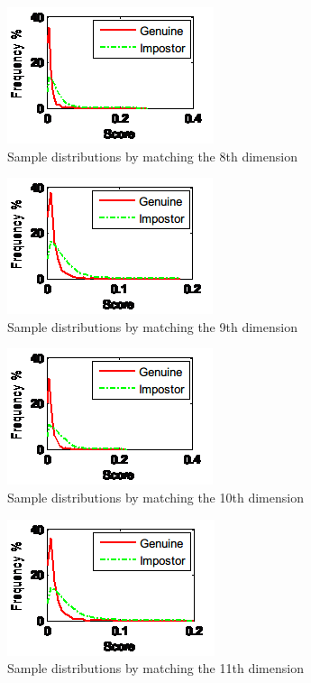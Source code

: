 \begin{figure}[htb]
  \begin{center}
    \includegraphics[scale=1]{ch-experiment/figures/11h}
    \caption{Sample distributions by matching the 8th dimension}
    \label{fig:experiment:11h}
  \end{center}
\end{figure}

\begin{figure}[htb]
  \begin{center}
    \includegraphics[scale=1]{ch-experiment/figures/11i}
    \caption{Sample distributions by matching the 9th dimension}
    \label{fig:experiment:11i}
  \end{center}
\end{figure}

\begin{figure}[htb]
  \begin{center}
    \includegraphics[scale=1]{ch-experiment/figures/11j}
    \caption{Sample distributions by matching the 10th dimension}
    \label{fig:experiment:11j}
  \end{center}
\end{figure}

\begin{figure}[htb]
  \begin{center}
    \includegraphics[scale=1]{ch-experiment/figures/11k}
    \caption{Sample distributions by matching the 11th dimension}
    \label{fig:experiment:11k}
  \end{center}
\end{figure}

